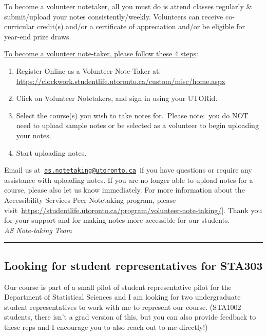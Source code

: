 \documentclass[
  openany]{book}
\begin{document}
To become a volunteer notetaker, all you must do is attend classes regularly \& submit/upload your notes consistently/weekly. Volunteers can receive co-curricular credit(s) and/or a certificate of appreciation and/or be eligible for year-end prize draws.

\underline{To become a volunteer note-taker, please follow these 4 steps}:

\begin{enumerate}
\def\labelenumi{\arabic{enumi}.}
\item
  Register Online as a Volunteer Note-Taker at: \url{https://clockwork.studentlife.utoronto.ca/custom/misc/home.aspx}
\item
  Click on Volunteer Notetakers, and sign in using your UTORid.
\item
  Select the course(s) you wish to take notes for.~Please note:~you do NOT need to upload sample notes or be selected as a volunteer to begin uploading your notes.
\item
  Start uploading notes.
\end{enumerate}

Email us at~\href{mailto:as.notetaking@utoronto.ca}{\nolinkurl{as.notetaking@utoronto.ca}}~if you have questions or require any assistance with uploading notes. If you are no longer able to upload notes for a course, please also let us know immediately. For more information about the Accessibility Services Peer Notetaking program, please visit~\href{https://studentlife.utoronto.ca/program/volunteer-note-taking}{https://studentlife.utoronto.ca/program/volunteer-note-taking/}{]}. Thank you for your support and for making notes more accessible for our students.\\

\emph{AS Note-taking Team\\
}

\begin{center}\rule{0.5\linewidth}{0.5pt}\end{center}

\hypertarget{studentrep}{%
\subsection{Looking for student representatives for STA303}\label{studentrep}}

Our course is part of a small pilot of student representative pilot for the Department of Statistical Sciences and I am looking for two undergraduate student representatives to work with me to represent our course. (STA1002 students, there isn't a grad version of this, but you can also provide feedback to these reps and I encourage you to also reach out to me directly!)
\end{document}
